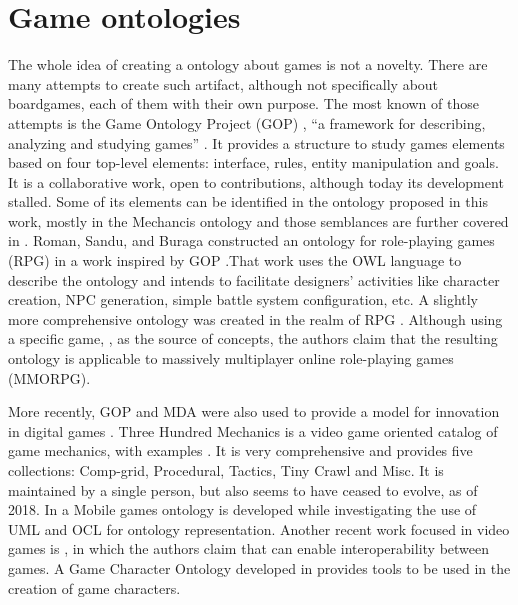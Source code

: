 \section{Game ontologies}

The whole idea of creating a ontology about games is not a novelty. There are many attempts to create such artifact, although not specifically about boardgames, each of them with their own purpose. The most known of those attempts is the Game Ontology Project (GOP) \citep{wiki:gop}, “a framework for describing, analyzing and studying games” \citep{Zagal:2008:GOP}. It  provides  a  structure  to  study  games  elements  based  on four top-level elements:  interface,  rules,  entity manipulation and goals. It  is  a  collaborative  work,  open  to  contributions, although today its development stalled. Some of its elements can be identified in the ontology proposed in this work, mostly in the Mechancis ontology and those semblances are further covered in \cite{kritz_buildingOntology}. Roman,  Sandu,  and  Buraga  constructed  an  ontology  for  role-playing games (RPG) in a work inspired by GOP \citep{roman2011owl}.That work uses the OWL language to describe the ontology and intends to facilitate designers’ activities like character creation, NPC generation, simple battle system configuration, etc. A slightly more comprehensive  ontology was created in the realm of RPG \citep{dhuric2015specific}. Although  using  a  specific  game,  \cite{manaworld}, as the source of concepts, the authors claim that the resulting ontology is applicable to massively multiplayer online role-playing games (MMORPG).

More recently, GOP and MDA were also used to provide a model for innovation in digital games \citep{innov:gop:mda}. Three Hundred Mechanics is a video game oriented catalog of game mechanics, with examples \citep{300gm}. It is very comprehensive and provides five collections: Comp-grid, Procedural, Tactics, Tiny Crawl and Misc. It is maintained by a single person, but also seems to have ceased to evolve, as of 2018. In \cite{leon_z._ontology_2010} a Mobile games ontology is developed while investigating the use of UML and OCL for ontology representation. Another recent work focused in video games is \cite{parkkila_ontology_2017}, in which the authors claim that can enable interoperability between games. A Game Character Ontology developed in \cite{sacco_game_2017} provides tools to be used in the creation of game characters.

